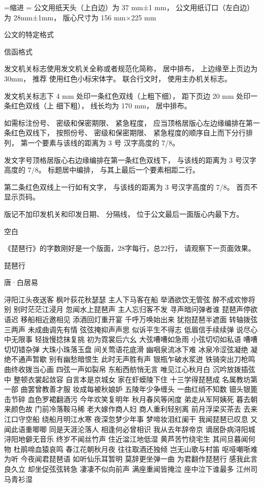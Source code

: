 \documentclass[a4paper,twoside]{article}
\begin{document}
\fontsize{15.85pt}{0pt}
\selectfont
{}=\hbox{缩进}
\parindent=
\baselineskip=29.71875pt
公文用纸天头（上白边）为 37 mm±1 mm，
公文用纸订口（左白边）为 28mm±1mm，
版心尺寸为 156 mm×225 mm

 公文的特定格式

 信函格式

发文机关标志使用发文机关全称或者规范化简称， 居中排布， 上边缘至上页边为 30mm， 推荐
使用红色小标宋体字。 联合行文时， 使用主办机关标志。

发文机关标志下 4 mm 处印一条红色双线（上粗下细）， 距下页边 20 mm 处印一条红色双线（上
细下粗）， 线长均为 170 mm， 居中排布。

如需标注份号、 密级和保密期限、 紧急程度， 应当顶格居版心左边缘编排在第一条红色双线下，
按照份号、 密级和保密期限、 紧急程度的顺序自上而下分行排列， 第一个要素与该线的距离为 3 号
汉字高度的 7/8。

发文字号顶格居版心右边缘编排在第一条红色双线下， 与该线的距离为 3 号汉字高度的 7/8。
标题居中编排， 与其上最后一个要素相距二行。

第二条红色双线上一行如有文字， 与该线的距离为 3 号汉字高度的 7/8。
首页不显示页码。

版记不加印发机关和印发日期、 分隔线， 位于公文最后一面版心内最下方。
\newpage
\begin{center}
  空白
\end{center}

\vfill
《琵琶行》的字数刚好是一个版面，28字每行，总22行，
请观察下一页面效果。
\begin{center}
琵\quad 琶\quad 行

唐·白居易
\end{center}
\newpage
\noindent%
浔阳江头夜送客 枫叶荻花秋瑟瑟
主人下马客在船 举酒欲饮无管弦%
醉不成欢惨将别 别时茫茫江浸月
%
忽闻水上琵琶声 主人忘归客不发%
寻声暗问弹者谁 琵琶声停欲语迟
移船相近邀相见 添酒回灯重开宴%
千呼万唤始出来 犹抱琵琶半遮面
转轴拨弦三两声 未成曲调先有情%
弦弦掩抑声声思 似诉平生不得志
低眉信手续续弹 说尽心中无限事%
轻拢慢捻抹复挑 初为霓裳后六幺
大弦嘈嘈如急雨 小弦切切如私语%
嘈嘈切切错杂弹 大珠小珠落玉盘
间关莺语花底滑 幽咽泉流冰下难%
冰泉冷涩弦凝绝 凝绝不通声暂歇
别有幽愁暗恨生 此时无声胜有声%
银瓶乍破水浆迸 铁骑突出刀枪鸣
曲终收拨当心画 四弦一声如裂帛%
东船西舫悄无言 唯见江心秋月白
%
沉吟放拨插弦中 整顿衣裳起敛容%
自言本是京城女 家在虾蟆陵下住
十三学得琵琶成 名属教坊第一部%
曲罢曾教善才服 妆成每被秋娘妒
五陵年少争缠头 一曲红绡不知数%
钿头银篦击节碎 血色罗裙翻酒污
今年欢笑复明年 秋月春风等闲度%
弟走从军阿姨死 暮去朝来颜色故
门前冷落鞍马稀 老大嫁作商人妇%
商人重利轻别离 前月浮梁买茶去
去来江口守空船 绕船月明江水寒%
夜深忽梦少年事 梦啼妆泪红阑干
%
我闻琵琶已叹息 又闻此语重唧唧%
同是天涯沦落人 相逢何必曾相识
我从去年辞帝京 谪居卧病浔阳城%
浔阳地僻无音乐 终岁不闻丝竹声
住近湓江地低湿 黄芦苦竹绕宅生%
其间旦暮闻何物 杜鹃啼血猿哀鸣
春江花朝秋月夜 往往取酒还独倾%
岂无山歌与村笛 呕哑嘲哳难为听
今夜闻君琵琶语 如听仙乐耳暂明%
莫辞更坐弹一曲 为君翻作琵琶行
感我此言良久立 却坐促弦弦转急%
凄凄不似向前声 满座重闻皆掩泣
座中泣下谁最多 江州司马青衫湿%
\end{document}
